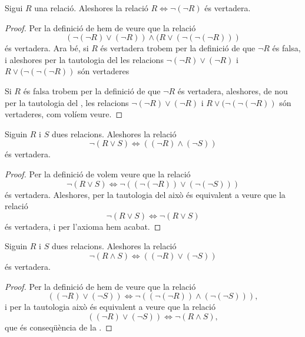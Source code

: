 \documentclass[../Apunts.tex]{subfiles}
\begin{document}
	\begin{tautology}
		\label{taut:R és equivalent a no no R}
		Sigui \(R\) una relació. Aleshores la relació \(R\Leftrightarrow\lnot(\lnot R)\) és vertadera.
		\begin{proof}
			Per la definició de  hem de veure que la relació
			\[(\lnot(\lnot R)\lor(\lnot R))\land(R\lor(\lnot(\lnot(\lnot R)))\]
			és vertadera. Ara bé, si \(R\) és vertadera trobem per la definició de  que \(\lnot R\) és falsa, i aleshores per la tautologia del  les relacions \(\lnot(\lnot R)\lor(\lnot R)\) i \(R\lor(\lnot(\lnot(\lnot R))\) són vertaderes
			
			Si \(R\) és falsa trobem per la definició de  que \(\lnot R\) és vertadera, aleshores, de nou per la tautologia del , les relacions \(\lnot(\lnot R)\lor(\lnot R)\) i \(R\lor(\lnot(\lnot(\lnot R))\) són vertaderes, com volíem veure.
		\end{proof}
	\end{tautology}
	\begin{tautology}
		\label{taut:primera llei de De Morgan}
		Siguin \(R\) i \(S\) dues relacions. Aleshores la relació
		\[\lnot(R\lor S)\Leftrightarrow((\lnot R)\land(\lnot S))\]
		és vertadera.
		\begin{proof}
			Per la definició de  volem veure que la relació
			\[\lnot(R\lor S)\Leftrightarrow\lnot((\lnot(\lnot R))\lor(\lnot(\lnot S)))\]
			és vertadera. Aleshores, per la tautologia del  això és equivalent a veure que la relació
			\[\lnot(R\lor S)\Leftrightarrow\lnot(R\lor S)\]
			és vertadera, i per l'axioma  hem acabat.
		\end{proof}
	\end{tautology}
	\begin{tautology}
		\label{taut:segona llei de De Morgan}
		Siguin \(R\) i \(S\) dues relacions. Aleshores la relació
		\[\lnot(R\land S)\Leftrightarrow((\lnot R)\lor(\lnot S))\]
		és vertadera.
		\begin{proof}
			Per la definició de  hem de veure que la relació
			\[((\lnot R)\lor(\lnot S))\Leftrightarrow\lnot((\lnot(\lnot R))\land(\lnot (\lnot S))),\]
			i per la tautologia  això és equivalent a veure que la relació
			\[((\lnot R)\lor(\lnot S))\Leftrightarrow\lnot(R\land S),\]
			que és conseqüència de la \myref{taut:primera llei de De Morgan}.
		\end{proof}
	\end{tautology}
\end{document}
